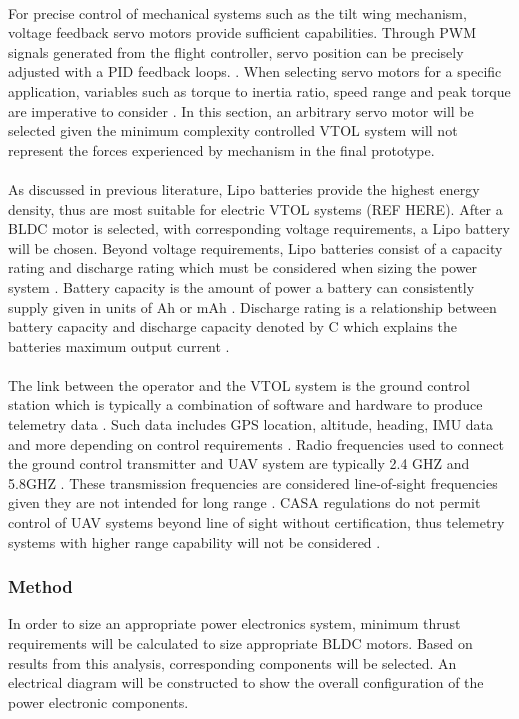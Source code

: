\\
For precise control of mechanical systems such as the tilt wing mechanism, voltage feedback servo motors provide sufficient capabilities. Through PWM signals generated from the flight controller, servo position can be precisely adjusted with a PID feedback loops. \cite{van1981motor}. When selecting servo motors for a specific application, variables such as torque to inertia ratio, speed range and peak torque are imperative to consider \cite{krishnan1987selection}. In this section, an arbitrary servo motor will be selected given the minimum complexity controlled VTOL system will not represent the forces experienced by mechanism in the final prototype.\\
\\
As discussed in previous literature, Lipo batteries provide the highest energy density, thus are most suitable for electric VTOL systems (REF HERE). After a BLDC motor is selected, with corresponding voltage requirements, a Lipo battery will be chosen. Beyond voltage requirements, Lipo batteries consist of a capacity rating and discharge rating which must be considered when sizing the power system \cite{chang2016lipo}. Battery capacity is the amount of power a battery can consistently supply given in units of Ah or mAh \cite{chuangfeng2011measurement}. Discharge rating is a relationship between battery capacity and discharge capacity denoted by C which explains the batteries maximum output current \cite{chuangfeng2011measurement}. \\
\\
The link between the operator and the VTOL system is the ground control station which is typically a combination of software and hardware to produce telemetry data \cite{haque2017drone}. Such data includes GPS location, altitude, heading, IMU data and more depending on control requirements \cite{haque2017drone}. Radio frequencies used to connect the ground control transmitter and UAV system are typically 2.4 GHZ and 5.8GHZ \cite{Radio}. These transmission frequencies are considered line-of-sight frequencies given they are not intended for long range \cite{Radio}. CASA regulations do not permit control of UAV systems beyond line of sight without certification, thus telemetry systems with higher range capability will not be considered \cite{CASALaw}. 
\subsubsection{Method}
In order to size an appropriate power electronics system, minimum thrust requirements will be calculated to size appropriate BLDC motors. Based on results from this analysis, corresponding components will be selected. An electrical diagram will be constructed to show the overall configuration of the power electronic components.\\
